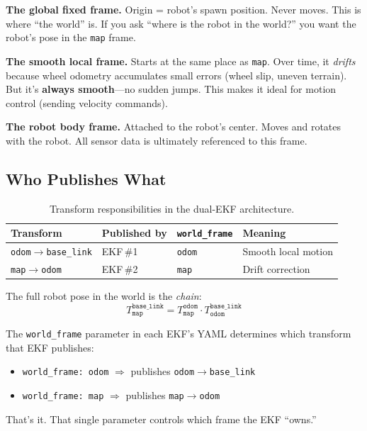 \documentclass[11pt,a4paper]{article}
\begin{document}
\begin{description}[leftmargin=2em, itemsep=6pt]
  \item[\textcolor{RoyalBlue}{\texttt{map}}] \textbf{The global fixed frame.}
    Origin = robot's spawn position. Never moves. This is where ``the world''
    is. If you ask ``where is the robot in the world?'' you want the robot's
    pose in the \texttt{map} frame.

  \item[\textcolor{ForestGreen}{\texttt{odom}}] \textbf{The smooth local
    frame.} Starts at the same place as \texttt{map}. Over time, it
    \emph{drifts} because wheel odometry accumulates small errors (wheel slip,
    uneven terrain). But it's \textbf{always smooth}---no sudden jumps. This
    makes it ideal for motion control (sending velocity commands).

  \item[\textcolor{BrickRed}{\texttt{base\_link}}] \textbf{The robot body
    frame.} Attached to the robot's center. Moves and rotates with the robot.
    All sensor data is ultimately referenced to this frame.
\end{description}

\subsection{Who Publishes What}

\begin{table}[H]
\centering
\begin{tabular}{@{}llll@{}}
\toprule
\textbf{Transform} & \textbf{Published by} & \textbf{\texttt{world\_frame}} & \textbf{Meaning} \\
\midrule
\texttt{odom}$\rightarrow$\texttt{base\_link} & EKF\,\#1 & \texttt{odom} & Smooth local motion \\
\texttt{map}$\rightarrow$\texttt{odom} & EKF\,\#2 & \texttt{map} & Drift correction \\
\bottomrule
\end{tabular}
\caption{Transform responsibilities in the dual-EKF architecture.}
\end{table}

The full robot pose in the world is the \emph{chain}:
\begin{equation}
  T_{\texttt{map}}^{\texttt{base\_link}} = T_{\texttt{map}}^{\texttt{odom}} \cdot T_{\texttt{odom}}^{\texttt{base\_link}}
\end{equation}

\begin{keyidea}
The \texttt{world\_frame} parameter in each EKF's YAML determines which
transform that EKF publishes:
\begin{itemize}
  \item \texttt{world\_frame: odom} $\Rightarrow$ publishes \texttt{odom}$\rightarrow$\texttt{base\_link}
  \item \texttt{world\_frame: map} $\Rightarrow$ publishes \texttt{map}$\rightarrow$\texttt{odom}
\end{itemize}
That's it. That single parameter controls which frame the EKF ``owns.''
\end{keyidea}
\end{document}
